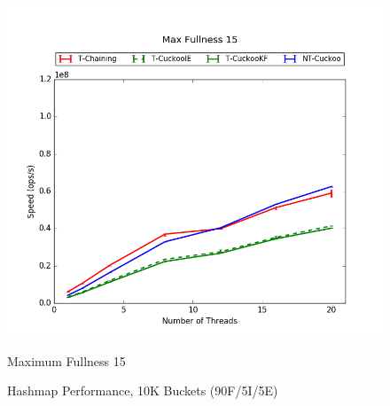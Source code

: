 \begin{figure}[H]
\begin{minipage}{0.45\textwidth}
    \end{minipage}
	\begin{minipage}{0.45\textwidth}\includegraphics[width=\textwidth]{maps/15HM1M:F90,I5,E5.png} 
        \caption*{Maximum Fullness 15}
    \end{minipage}
	\caption{Hashmap Performance, 10K Buckets (90F/5I/5E)}
\end{figure}


